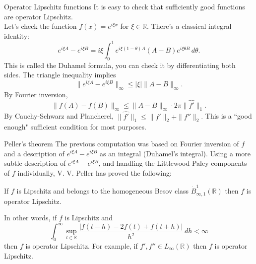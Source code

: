 \documentclass{beamer}
\numberwithin{equation}{section}
\theoremstyle{plain}
\theoremstyle{plain}
\theoremstyle{definition}
\theoremstyle{plain}
\theoremstyle{plain}
\theoremstyle{definition}
\newcommand{\Rl}{\mathbb{R}}
\begin{document}
\begin{frame}{Operator Lipschitz functions}
    It is easy to check that sufficiently good functions are operator Lipschitz.\\
    Let's check the function $f(x) = e^{i\xi x}$ for $\xi\in \Rl.$ There's a classical integral identity:
    \begin{equation*}
        e^{i\xi A}-e^{i\xi B} = i\xi\int_{0}^1 e^{i\xi (1-\theta)A}(A-B)e^{i\xi \theta B}\,d\theta.
    \end{equation*}
    This is called the Duhamel formula, you can check it by differentiating both sides. The triangle inequality implies
    $$
        \|e^{i\xi A}-e^{i\xi B}\|_{\infty} \leq |\xi|\|A-B\|_{\infty}.
    $$
    \pause
    By Fourier inversion,
    \begin{equation*}
        \|f(A)-f(B)\|_{\infty} \leq \|A-B\|_\infty\cdot 2\pi \|\widehat{f'}\|_1.
    \end{equation*}
    \pause
    By Cauchy-Schwarz and Plancherel, $\|\widehat{f'}\|_1 \leq \|f'\|_2+\|f''\|_2.$ This is a ``good enough" sufficient condition for most purposes.
\end{frame}

\begin{frame}{Peller's theorem}
    The previous computation was based on Fourier inversion of $f$ and a description of $e^{i\xi A}-e^{i\xi B}$ as an integral (Duhamel's integral).
    \pause
    Using a more subtle description of $e^{i\xi A}-e^{i\xi B}$, and handling the Littlewood-Paley components of $f$
    individually, V. V. Peller has proved the following:
    \begin{theorem}[Peller (1990)]
        If $f$ is Lipschitz and belongs to the homogeneous Besov class $\dot{B}^1_{\infty,1}(\Rl)$ then $f$ is operator Lipschitz.
    \end{theorem}
    \pause
    In other words, if $f$ is Lipschitz and
    \begin{equation*}
        \int_0^\infty \sup_{t\in \Rl} \frac{|f(t-h)-2f(t)+f(t+h)|}{h^2} \,dh < \infty
    \end{equation*}
    then $f$ is operator Lipschitz. 
    \pause
    For example, if $f',f'' \in L_{\infty}(\Rl)$ then $f$ is operator Lipschitz.
\end{frame}
\end{document}
